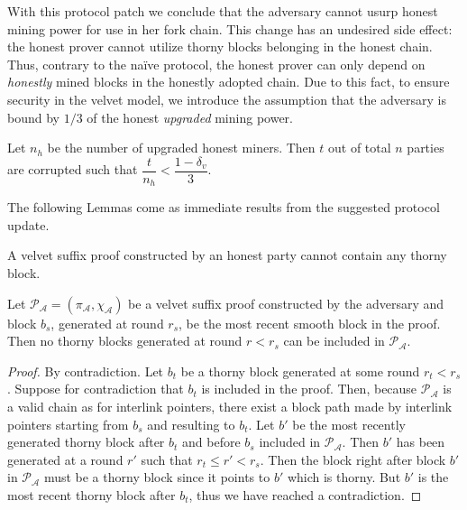 With this protocol patch we conclude that the adversary cannot usurp honest mining power for use in her fork chain. This change has an undesired side effect: the honest prover cannot utilize thorny blocks belonging in the honest chain. Thus, contrary to the na\"ive protocol, the honest prover can only depend on \emph{honestly} mined blocks in the honestly adopted chain. Due to this fact, to ensure security in the velvet model, we introduce the assumption that the adversary is bound by $1/3$ of the honest \emph{upgraded} mining power.

\begin{definition}
	Let $n_h$ be the number of upgraded honest miners. Then $t$ out of total $n$ parties are corrupted such that $\dfrac{t}{n_h} < \dfrac{1 - \delta_v}{3} $.
	\label{defn:velvet_honest_majority}
\end{definition}

The following Lemmas come as immediate results from the suggested protocol
update.

\begin{lemma}
	A velvet suffix proof constructed by an honest party cannot contain any thorny block.
	\label{lemm:smooth_honest_suffix}
\end{lemma}

\begin{lemma}
	Let $\mathcal{P_A} = (\pi_\mathcal{A}, \chi_\mathcal{A})$ be a velvet suffix proof constructed by the adversary and block $b_s$, generated at round $r_s$, be the most recent smooth block in the proof. Then no thorny blocks generated at round $r < r_s$ can be included in $\mathcal{P_A}$.
	\label{lemm:smooths_before_smooth}
\end{lemma}
\begin{proof}
By contradiction. Let $b_t$ be a thorny block generated at some round $r_t < r_s$. Suppose for contradiction that $b_t$ is included in the proof. Then, because $\mathcal{P_A}$ is a valid chain as for interlink pointers, there exist a block path made by interlink pointers starting from $b_s$ and resulting to $b_t$. Let $b'$ be the most recently generated thorny block after $b_t$ and before $b_s$ included in $\mathcal{P_A}$. Then $b'$ has been generated at a round $r'$ such that $r_t \leq r' < r_s$. Then the block right after block $b'$ in $\mathcal{P_A}$ must be a thorny block since it points to $b'$ which is thorny. But $b'$ is the most recent thorny block after $b_t$, thus we have reached a contradiction.
\end{proof}

